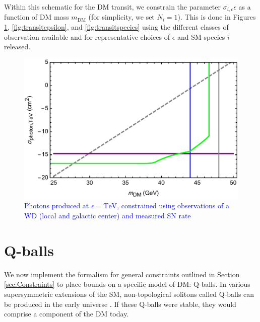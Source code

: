 \documentclass[twocolumn,showpacs,preprintnumbers,amsmath,amssymb,prd]{revtex4}
\begin{document}
Within this schematic for the DM transit, we constrain the parameter $\sigma_{i,\epsilon} \epsilon$ as a function of DM mass $m_\text{DM}$ (for simplicity, we set $N_i = 1$).
This is done in Figures \ref{fig:transitclasses}, \ref{fig:transitepsilon}, and \ref{fig:transitspecies} using the different classes of observation available and for representative choices of $\epsilon$ and SM species $i$ released.


\begin{figure}
\includegraphics[scale=.45]{transitobservation.pdf}
\caption{\textcolor{blue}{Photons produced at $\epsilon = \text{TeV}$, constrained using observations of a WD (local and galactic center) and measured SN rate}}
\label{fig:transitclasses}
\end{figure}

\section{Q-balls}
\label{sec:ConcreteExamples}

We now implement the formalism for general constraints outlined in Section \ref{sec:Constraints} to place bounds on a specific model of DM: Q-balls.
In various supersymmetric extensions of the SM, non-topological solitons called Q-balls can be produced in the early universe \cite{Coleman:1985ki, Kusenko:1997si}.
If these Q-balls were stable, they would comprise a component of the DM today.
\end{document}
